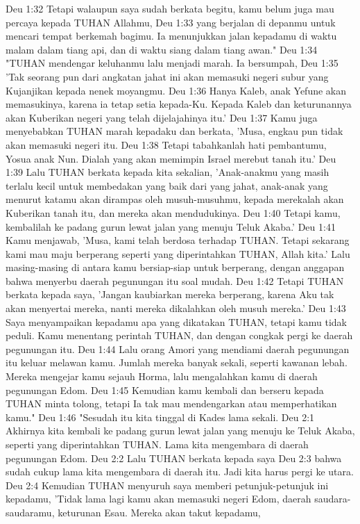 Deu 1:32  Tetapi walaupun saya sudah berkata begitu, kamu belum juga mau percaya kepada TUHAN Allahmu,
Deu 1:33  yang berjalan di depanmu untuk mencari tempat berkemah bagimu. Ia menunjukkan jalan kepadamu di waktu malam dalam tiang api, dan di waktu siang dalam tiang awan."
Deu 1:34  "TUHAN mendengar keluhanmu lalu menjadi marah. Ia bersumpah,
Deu 1:35  'Tak seorang pun dari angkatan jahat ini akan memasuki negeri subur yang Kujanjikan kepada nenek moyangmu.
Deu 1:36  Hanya Kaleb, anak Yefune akan memasukinya, karena ia tetap setia kepada-Ku. Kepada Kaleb dan keturunannya akan Kuberikan negeri yang telah dijelajahinya itu.'
Deu 1:37  Kamu juga menyebabkan TUHAN marah kepadaku dan berkata, 'Musa, engkau pun tidak akan memasuki negeri itu.
Deu 1:38  Tetapi tabahkanlah hati pembantumu, Yosua anak Nun. Dialah yang akan memimpin Israel merebut tanah itu.'
Deu 1:39  Lalu TUHAN berkata kepada kita sekalian, 'Anak-anakmu yang masih terlalu kecil untuk membedakan yang baik dari yang jahat, anak-anak yang menurut katamu akan dirampas oleh musuh-musuhmu, kepada merekalah akan Kuberikan tanah itu, dan mereka akan mendudukinya.
Deu 1:40  Tetapi kamu, kembalilah ke padang gurun lewat jalan yang menuju Teluk Akaba.'
Deu 1:41  Kamu menjawab, 'Musa, kami telah berdosa terhadap TUHAN. Tetapi sekarang kami mau maju berperang seperti yang diperintahkan TUHAN, Allah kita.' Lalu masing-masing di antara kamu bersiap-siap untuk berperang, dengan anggapan bahwa menyerbu daerah pegunungan itu soal mudah.
Deu 1:42  Tetapi TUHAN berkata kepada saya, 'Jangan kaubiarkan mereka berperang, karena Aku tak akan menyertai mereka, nanti mereka dikalahkan oleh musuh mereka.'
Deu 1:43  Saya menyampaikan kepadamu apa yang dikatakan TUHAN, tetapi kamu tidak peduli. Kamu menentang perintah TUHAN, dan dengan congkak pergi ke daerah pegunungan itu.
Deu 1:44  Lalu orang Amori yang mendiami daerah pegunungan itu keluar melawan kamu. Jumlah mereka banyak sekali, seperti kawanan lebah. Mereka mengejar kamu sejauh Horma, lalu mengalahkan kamu di daerah pegunungan Edom.
Deu 1:45  Kemudian kamu kembali dan berseru kepada TUHAN minta tolong, tetapi Ia tak mau mendengarkan atau memperhatikan kamu."
Deu 1:46  "Sesudah itu kita tinggal di Kades lama sekali.
Deu 2:1  Akhirnya kita kembali ke padang gurun lewat jalan yang menuju ke Teluk Akaba, seperti yang diperintahkan TUHAN. Lama kita mengembara di daerah pegunungan Edom.
Deu 2:2  Lalu TUHAN berkata kepada saya
Deu 2:3  bahwa sudah cukup lama kita mengembara di daerah itu. Jadi kita harus pergi ke utara.
Deu 2:4  Kemudian TUHAN menyuruh saya memberi petunjuk-petunjuk ini kepadamu, 'Tidak lama lagi kamu akan memasuki negeri Edom, daerah saudara-saudaramu, keturunan Esau. Mereka akan takut kepadamu,
